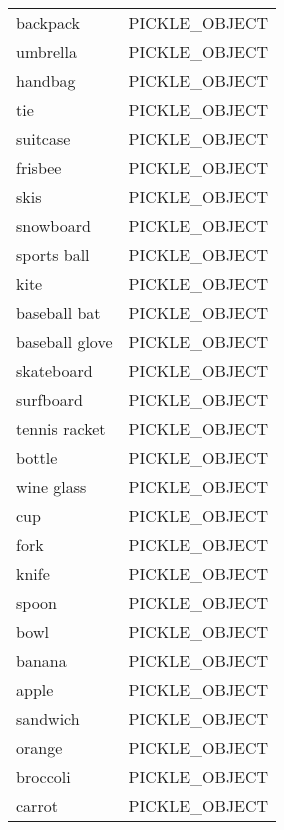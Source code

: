 \begin{supertabular}{|l|l|}
  backpack              & \tiny{PICKLE\_OBJECT    } \\
  umbrella              & \tiny{PICKLE\_OBJECT    } \\
  handbag               & \tiny{PICKLE\_OBJECT    } \\
  tie                   & \tiny{PICKLE\_OBJECT    } \\
  suitcase              & \tiny{PICKLE\_OBJECT    } \\
  frisbee               & \tiny{PICKLE\_OBJECT    } \\
  skis                  & \tiny{PICKLE\_OBJECT    } \\
  snowboard             & \tiny{PICKLE\_OBJECT    } \\
  sports ball           & \tiny{PICKLE\_OBJECT    } \\
  kite                  & \tiny{PICKLE\_OBJECT    } \\
  baseball bat          & \tiny{PICKLE\_OBJECT    } \\
  baseball glove        & \tiny{PICKLE\_OBJECT    } \\
  skateboard            & \tiny{PICKLE\_OBJECT    } \\
  surfboard             & \tiny{PICKLE\_OBJECT    } \\
  tennis racket         & \tiny{PICKLE\_OBJECT    } \\
  bottle                & \tiny{PICKLE\_OBJECT    } \\
  wine glass            & \tiny{PICKLE\_OBJECT    } \\
  cup                   & \tiny{PICKLE\_OBJECT    } \\
  fork                  & \tiny{PICKLE\_OBJECT    } \\
  knife                 & \tiny{PICKLE\_OBJECT    } \\
  spoon                 & \tiny{PICKLE\_OBJECT    } \\
  bowl                  & \tiny{PICKLE\_OBJECT    } \\
  banana                & \tiny{PICKLE\_OBJECT    } \\
  apple                 & \tiny{PICKLE\_OBJECT    } \\
  sandwich              & \tiny{PICKLE\_OBJECT    } \\
  orange                & \tiny{PICKLE\_OBJECT    } \\
  broccoli              & \tiny{PICKLE\_OBJECT    } \\
  carrot                & \tiny{PICKLE\_OBJECT    } \\

\end{supertabular}
